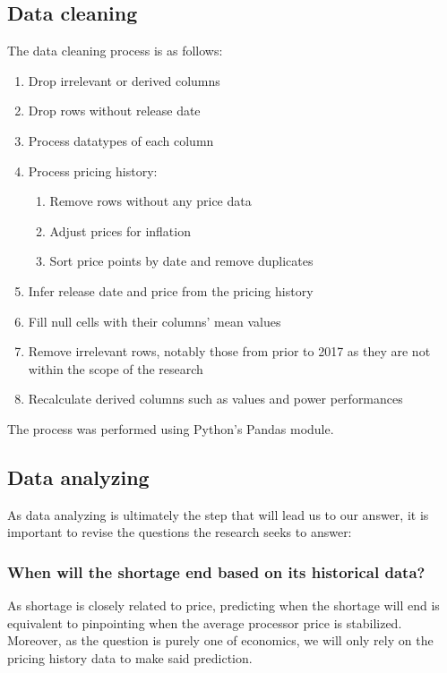 \documentclass[conference]{IEEEtran}
\begin{document}
\subsection{Data cleaning}
The data cleaning process is as follows:
\begin{enumerate}
	\item Drop irrelevant or derived columns
	\item Drop rows without release date
	\item Process datatypes of each column
	\item Process pricing history:
	      \begin{enumerate}
		      \item Remove rows without any price data
		      \item Adjust prices for inflation
		      \item Sort price points by date and remove duplicates
	      \end{enumerate}
	\item Infer release date and price from the pricing history
	\item Fill null cells with their columns' mean values
	\item Remove irrelevant rows, notably those from prior to 2017 as they are
	      not within the scope of the research
	\item Recalculate derived columns such as values and power performances
\end{enumerate}

The process was performed using Python's Pandas module.

\subsection{Data analyzing}
As data analyzing is ultimately the step that will lead us to our answer, it is
important to revise the questions the research seeks to answer:

\subsubsection{When will the shortage end based on its historical data?}

As shortage is closely related to price, predicting when the shortage will end
is equivalent to pinpointing when the average processor price is stabilized.
Moreover, as the question is purely one of economics, we will only rely on the
pricing history data to make said prediction.
\end{document}
